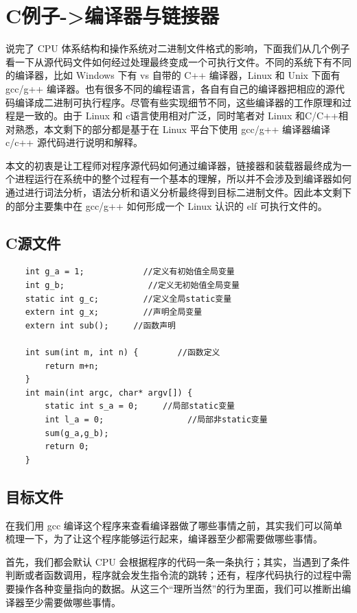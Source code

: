 \documentclass[UTF8,a4paper,12pt]{ctexbook}
\begin{document}
	\section{C例子->编译器与链接器}
		说完了 CPU 体系结构和操作系统对二进制文件格式的影响，下面我们从几个例子看一下从源代码文件如何经过处理最终变成一个可执行文件。不同的系统下有不同的编译器，比如 Windows 下有 vs 自带的 C++ 编译器，Linux 和 Unix 下面有 gcc/g++ 编译器。也有很多不同的编程语言，各自有自己的编译器把相应的源代码编译成二进制可执行程序。尽管有些实现细节不同，这些编译器的工作原理和过程是一致的。由于 Linux 和 c语言使用相对广泛，同时笔者对 Linux 和C/C++相对熟悉，本文剩下的部分都是基于在 Linux 平台下使用 gcc/g++ 编译器编译 c/c++ 源代码进行说明和解释。
		
		本文的初衷是让工程师对程序源代码如何通过编译器，链接器和装载器最终成为一个进程运行在系统中的整个过程有一个基本的理解，所以并不会涉及到编译器如何通过进行词法分析，语法分析和语义分析最终得到目标二进制文件。因此本文剩下的部分主要集中在 gcc/g++ 如何形成一个 Linux 认识的 elf 可执行文件的。
	
			\subsection{C源文件}
				\begin{lstlisting}
	int g_a = 1;            //定义有初始值全局变量
	int g_b;                 //定义无初始值全局变量
	static int g_c;         //定义全局static变量
	extern int g_x;         //声明全局变量
	extern int sub();     //函数声明
	
	int sum(int m, int n) {        //函数定义
		return m+n;
	}
	int main(int argc, char* argv[]) {
		static int s_a = 0;     //局部static变量
		int l_a = 0;                 //局部非static变量
		sum(g_a,g_b);
		return 0;
	}
				\end{lstlisting}
			
			\subsection{目标文件}
			
				在我们用 gcc 编译这个程序来查看编译器做了哪些事情之前，其实我们可以简单梳理一下，为了让这个程序能够运行起来，编译器至少都需要做哪些事情。
				
				首先，我们都会默认 CPU 会根据程序的代码一条一条执行；其实，当遇到了条件判断或者函数调用，程序就会发生指令流的跳转；还有，程序代码执行的过程中需要操作各种变量指向的数据。从这三个“理所当然”的行为里面，我们可以推断出编译器至少需要做哪些事情。
				
\end{document}
